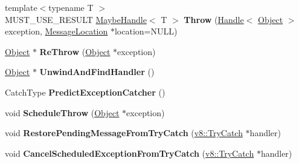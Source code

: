 \begin{DoxyCompactItemize}
\item 
{\footnotesize template$<$typename T $>$ }\\M\+U\+S\+T\+\_\+\+U\+S\+E\+\_\+\+R\+E\+S\+U\+LT \hyperlink{classv8_1_1internal_1_1_maybe_handle}{Maybe\+Handle}$<$ T $>$ {\bfseries Throw} (\hyperlink{classv8_1_1internal_1_1_handle}{Handle}$<$ \hyperlink{classv8_1_1internal_1_1_object}{Object} $>$ exception, \hyperlink{classv8_1_1internal_1_1_message_location}{Message\+Location} $\ast$location=N\+U\+LL)\hypertarget{classv8_1_1internal_1_1_isolate_acd59c1e3ce445ab7e9fa463125867097}{}\label{classv8_1_1internal_1_1_isolate_acd59c1e3ce445ab7e9fa463125867097}

\item 
\hyperlink{classv8_1_1internal_1_1_object}{Object} $\ast$ {\bfseries Re\+Throw} (\hyperlink{classv8_1_1internal_1_1_object}{Object} $\ast$exception)\hypertarget{classv8_1_1internal_1_1_isolate_a6277e16778948b45994e81a6dbf08c35}{}\label{classv8_1_1internal_1_1_isolate_a6277e16778948b45994e81a6dbf08c35}

\item 
\hyperlink{classv8_1_1internal_1_1_object}{Object} $\ast$ {\bfseries Unwind\+And\+Find\+Handler} ()\hypertarget{classv8_1_1internal_1_1_isolate_a47e06d6b1e3bf40a714b55f053ff398e}{}\label{classv8_1_1internal_1_1_isolate_a47e06d6b1e3bf40a714b55f053ff398e}

\item 
Catch\+Type {\bfseries Predict\+Exception\+Catcher} ()\hypertarget{classv8_1_1internal_1_1_isolate_ade7b738b6a9cecb8ac1a1bd9ec6a08e7}{}\label{classv8_1_1internal_1_1_isolate_ade7b738b6a9cecb8ac1a1bd9ec6a08e7}

\item 
void {\bfseries Schedule\+Throw} (\hyperlink{classv8_1_1internal_1_1_object}{Object} $\ast$exception)\hypertarget{classv8_1_1internal_1_1_isolate_a6d92f29b935a66b2dfd1ba29d61bdb4c}{}\label{classv8_1_1internal_1_1_isolate_a6d92f29b935a66b2dfd1ba29d61bdb4c}

\item 
void {\bfseries Restore\+Pending\+Message\+From\+Try\+Catch} (\hyperlink{classv8_1_1_try_catch}{v8\+::\+Try\+Catch} $\ast$handler)\hypertarget{classv8_1_1internal_1_1_isolate_a00200c36d3b121d71867d3e0df34d500}{}\label{classv8_1_1internal_1_1_isolate_a00200c36d3b121d71867d3e0df34d500}

\item 
void {\bfseries Cancel\+Scheduled\+Exception\+From\+Try\+Catch} (\hyperlink{classv8_1_1_try_catch}{v8\+::\+Try\+Catch} $\ast$handler)\hypertarget{classv8_1_1internal_1_1_isolate_a6a66af297d92704cc10c86fd28278b18}{}\label{classv8_1_1internal_1_1_isolate_a6a66af297d92704cc10c86fd28278b18}


\end{DoxyCompactItemize}
